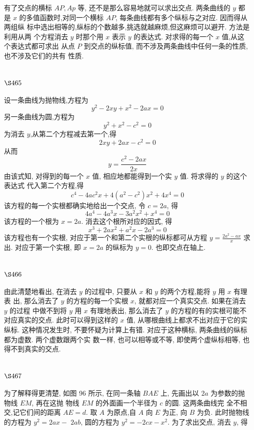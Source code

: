 有了交点的横标 $A P, A p$ 等, 还不是那么容易地就可以求出交点. 两条曲线的 $y$ 都是 $x$ 的多值函数时,对同一个横标 $A P$, 每条曲线都有多个纵标与之对应. 因而得从两组纵 标中选出相等的,纵标的个数越多,挑选就越麻烦,但这麻烦可以避开. 方法是利用从两 个方程消去 $y$ 时那个用 $x$ 表示 $y$ 的表达式. 对求得的每一个 $x$ 值,从这个表达式都可求出 从点 $P$ 到交点的纵标值, 而不涉及两条曲线中任何一条的性质, 也不涉及它们的共有 性质.

\section{$\S 465$}

设一条曲线为抛物线,方程为
\[
y^{2}-2 x y+x^{2}-2 a x=0
\]
另一条曲线为圆,方程为
\[
y^{2}+x^{2}-c^{2}=0
\]
为消去 $y$,从第二个方程减去第一个,得
\[
2 x y+2 a x-c^{2}=0
\]
从而
\[
y=\frac{c^{2}-2 a x}{2 x}
\]
由该式知, 对得到的每一个 $x$ 值, 相应地都能得到一个实 $y$ 值. 将求得的 $y$ 的这个表达式 代入第二个方程,得
\[
c^{4}-4 a c^{2} x+4\left(a^{2}-c^{2}\right) x^{2}+4 x^{4}=0
\]
该方程的每一个实根都确实地给出一个交点, 令 $c=2 a$, 得
\[
4 a^{4}-4 a^{3} x-3 a^{2} x^{2}+x^{4}=0
\]
该方程的一个根为 $x=2 a$. 消去这个根所对应的因式, 得
\[
x^{3}+2 a x^{2}+a^{2} x-2 a^{3}=0
\]
该方程也有一个实根, 对应于第一个和第二个实根的纵标都可从方程 $y=\frac{2 a^{2}-a x}{x}$ 求 出. 对应于第一个实根, 即 $x=2 a$ 的纵标为 $y=0$. 也即交点在轴上.

\section{$\S 466$}

由此清楚地看出, 在消去 $y$ 的过程中, 只要从 $x$ 和 $y$ 的两个方程,能将 $y$ 用 $x$ 有理表 出, 那么消去了 $y$ 的方程的每一个实根 $x$, 就都对应一个真实交点. 如果在消去 $y$ 的过程 中做不到将 $y$ 用 $x$ 有理地表出, 那么消去了 $y$ 的方程的有的实根可能不对应真实的交点. 此时可以得到这样的 $x$ 值, 从哪根曲线上都求不出对应于它的实纵标. 这种情况发生时, 不要怀疑为计算上有错. 对应于这种横标, 两条曲线的纵标都为虚数. 两个虚数跟两个实 数一样, 也可以相等或不等, 即使两个虚纵标相等, 也得不到真实的交点.

\section{$\S 467$}

为了解释得更清楚, 如图 96 所示, 在同一条轴 $B A E$ 上, 先画出以 $2 a$ 为参数的抛物线 $E M$, 再在这抛 物线 $E M$ 的外面画一个半径为 $c$ 的圆. 这两条曲线完 全不相交,记它们间的距离 $A E=d$. 取 $A$ 为原点,自 $A$ 向 $E$ 为正, 向 $B$ 为负. 此时抛物线的方程为 $y^{2}=2 a x-$ $2 a b$, 圆的方程为 $y^{2}=-2 c x-x^{2}$. 为了求出交点, 消去 $y$, 得



